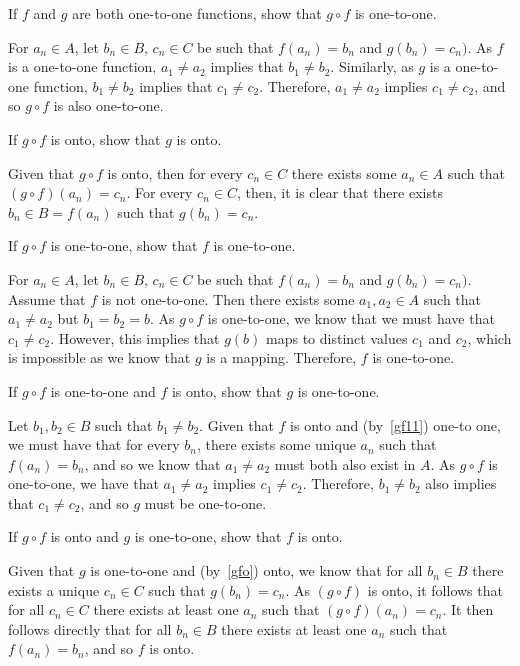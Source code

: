 \begin{exlist}
    \item If $f$ and $g$ are both one-to-one functions, show that $g \circ f$ is one-to-one.
    \hrlist

    For $a_n \in A$, let $b_n \in B$, $c_n \in C$ be such that $f(a_n) = b_n$ and $g(b_n) = c_n)$. As $f$ is a one-to-one function, $a_1 \neq a_2$ implies that $b_1 \neq b_2$. Similarly, as $g$ is a one-to-one function, $b_1 \neq b_2$ implies that $c_1 \neq c_2$. Therefore, $a_1 \neq a_2$ implies $c_1 \neq c_2$, and so $g \circ f$ is also one-to-one.
    \pagebreak
    \item\label{gfo} If $g \circ f$ is onto, show that $g$ is onto.
    \hrlist

    Given that $g \circ f$ is onto, then for every $c_n \in C$ there exists some $a_n \in A$ such that $(g \circ f)(a_n) = c_n$. For every $c_n \in C$, then, it is clear that there exists $b_n \in B = f(a_n)$ such that $g(b_n) = c_n$.
    \item\label{gf11} If $g \circ f$ is one-to-one, show that $f$ is one-to-one.
    \hrlist

    For $a_n \in A$, let $b_n \in B$, $c_n \in C$ be such that $f(a_n) = b_n$ and $g(b_n) = c_n)$. Assume that $f$ is not one-to-one. Then there exists some $a_1, a_2 \in A$ such that $a_1 \neq a_2$ but $b_1 = b_2 = b$. As $g \circ f$ is one-to-one, we know that we must have that $c_1 \neq c_2$. However, this implies that $g(b)$ maps to distinct values $c_1$ and $c_2$, which is impossible as we know that $g$ is a mapping. Therefore, $f$ is one-to-one.
    \item If $g \circ f$ is one-to-one and $f$ is onto, show that $g$ is one-to-one.
    \hrlist

    Let $b_1, b_2 \in B$ such that $b_1 \neq b_2$. Given that $f$ is onto and (by~\ref{gf11}) one-to one, we must have that for every $b_n$, there exists some unique $a_n$ such that $f(a_n) = b_n$, and so we know that $a_1 \neq a_2$ must both also exist in $A$. As $g \circ f$ is one-to-one, we have that $a_1 \neq a_2$ implies $c_1 \neq c_2$. Therefore, $b_1 \neq b_2$ also implies that $c_1 \neq c_2$, and so $g$ must be one-to-one.
    \item If $g \circ f$ is onto and $g$ is one-to-one, show that $f$ is onto.
    \hrlist

    Given that $g$ is one-to-one and (by~\ref{gfo}) onto, we know that for all $b_n \in B$ there exists a unique $c_n \in C$ such that $g(b_n) = c_n$. As $(g \circ f)$ is onto, it follows that for all $c_n \in C$ there exists at least one $a_n$ such that $(g \circ f)(a_n) = c_n$. It then follows directly that for all $b_n \in B$ there exists at least one $a_n$ such that $f(a_n) = b_n$, and so $f$ is onto.
\end{exlist}
\pagebreak
